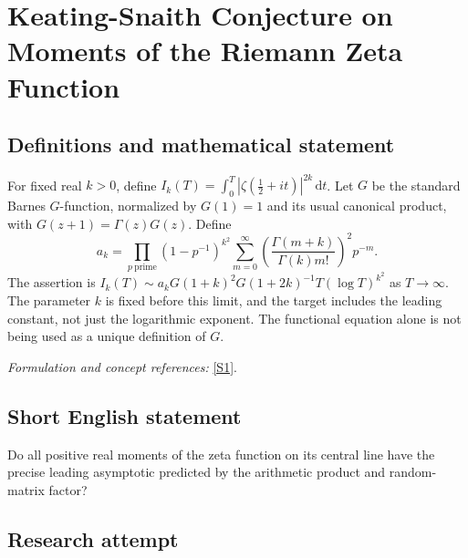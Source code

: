 \documentclass[11pt,a4paper]{article}
\newcommand{\dd}{\,\mathrm d}
\newcommand{\sref}[2]{\hyperlink{source:#1:#2}{[S#2]}}
\newif\ifshowcatalogue
\newcommand{\cataloguescope}[1]{\ifshowcatalogue
 \paragraph{Exact scope in the supplied catalogue.}
 \begin{quote}\small #1\end{quote}\fi}
\numberwithin{equation}{section}
\begin{document}
\setcounter{section}{161}
\clearpage
\section{\texorpdfstring{Keating-Snaith Conjecture on Moments of the Riemann Zeta Function}{Keating-Snaith Conjecture on Moments of the Riemann Zeta Function}}\label{162}
\subsection{Definitions and mathematical statement}
For fixed real $k>0$, define $I_k(T)=\int_0^T|\zeta(\tfrac12+it)|^{2k}\dd t$. Let $G$ be the standard Barnes $G$-function, normalized by $G(1)=1$ and its usual canonical product, with $G(z+1)=\Gamma(z)G(z)$. Define
\[
 a_k=\prod_{p\ \mathrm{prime}}(1-p^{-1})^{k^2}
 \sum_{m=0}^{\infty}\left(\frac{\Gamma(m+k)}{\Gamma(k)m!}\right)^2p^{-m}.
\]
The assertion is
$I_k(T)\sim a_kG(1+k)^2G(1+2k)^{-1}T(\log T)^{k^2}$ as $T\to\infty$. The parameter $k$ is fixed before this limit, and the target includes the leading constant, not just the logarithmic exponent. The functional equation alone is not being used as a unique definition of $G$.
\par\smallskip\textit{Formulation and concept references:} \sref{162}{1}.
\cataloguescope{For every fixed real k>0, let I\_k(T)=integral\_0\textasciicircum{}T |zeta(1/2+it)|\textasciicircum{}(2k) dt. Prove that I\_k(T) is asymptotic to a\_k G(1+k)\textasciicircum{}2/G(1+2k) times T(log T)\textasciicircum{}(k\textasciicircum{}2), where G is the Barnes G-function and a\_k=product\_p (1-1/p)\textasciicircum{}(k\textasciicircum{}2) sum\_(m>=0) (Gamma(m+k)/(Gamma(k)m!))\textasciicircum{}2 p\textasciicircum{}(-m).}
\subsection{Short English statement}
Do all positive real moments of the zeta function on its central line have the precise leading asymptotic predicted by the arithmetic product and random-matrix factor?
\subsection{Research attempt}
\end{document}
